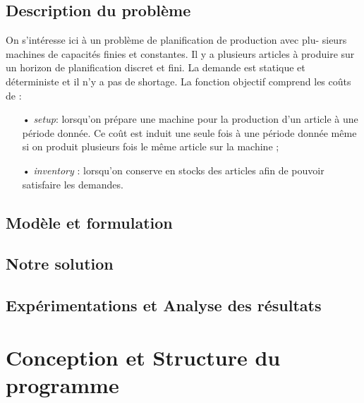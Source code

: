 \documentclass[12pt,a4paper]{article}
\begin{document}
		\subsection{Description du problème}
		On s’intéresse ici à un problème de planification de production avec plu-
sieurs machines de capacités finies et constantes. Il y a plusieurs articles à
produire sur un horizon de planification discret et fini. La demande est statique et déterministe et il n’y a pas de shortage. La fonction objectif comprend
les coûts de :
		\begin{itemize}
			\item[•] \emph{setup}: lorsqu’on prépare une machine pour la production d’un article à une période donnée. Ce coût est induit une seule fois
à une période donnée même si on produit plusieurs fois le même article sur la machine ;
			\item[•] \emph{inventory} : lorsqu'on conserve en stocks des articles afin de pouvoir satisfaire les demandes.
		\end{itemize}
		\subsection{Modèle et formulation}
		\subsection{Notre solution}
		\subsection{Expérimentations et Analyse des résultats}
		
	\section{Conception et Structure du programme}
\end{document}

